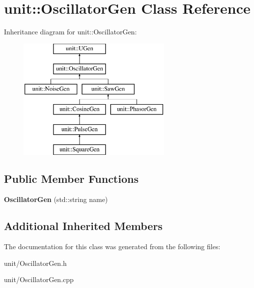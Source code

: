 \hypertarget{classunit_1_1OscillatorGen}{}\section{unit\+:\+:Oscillator\+Gen Class Reference}
\label{classunit_1_1OscillatorGen}
Inheritance diagram for unit\+:\+:Oscillator\+Gen\+:\begin{figure}[H]
\begin{center}
\leavevmode
\includegraphics[height=6.000000cm]{classunit_1_1OscillatorGen}
\end{center}
\end{figure}
\subsection*{Public Member Functions}
\begin{DoxyCompactItemize}
\item 
{\bfseries Oscillator\+Gen} (std\+::string name)\hypertarget{classunit_1_1OscillatorGen_ab84067cdd1c0a20d238ddcaaadda12da}{}\label{classunit_1_1OscillatorGen_ab84067cdd1c0a20d238ddcaaadda12da}

\end{DoxyCompactItemize}
\subsection*{Additional Inherited Members}


The documentation for this class was generated from the following files\+:\begin{DoxyCompactItemize}
\item 
unit/Oscillator\+Gen.\+h\item 
unit/Oscillator\+Gen.\+cpp\end{DoxyCompactItemize}
